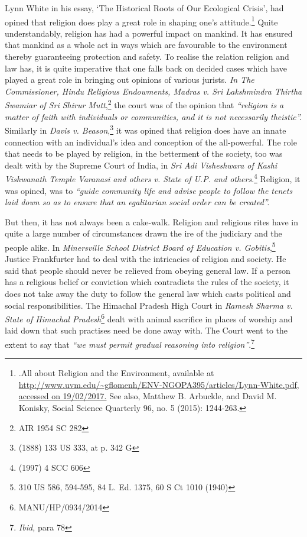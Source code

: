 \begin{multicols}{2}
\noi
Lynn White in his essay, ‘The Historical Roots of Our Ecological Crisis’, had opined that
religion does play a great role in shaping one’s attitude.\footnote{.All about Religion and the Environment, available at \url{http://www.uvm.edu/~gflomenh/ENV-NGOPA395/articles/Lynn-White.pdf, accessed on 19/02/2017.} See also, Matthew B. Arbuckle, and David M. Konisky, Social Science Quarterly 96, no. 5 (2015): 1244-263.} Quite understandably, religion has
had a powerful impact on mankind. It has ensured that mankind as a whole act in ways which
are favourable to the environment thereby guaranteeing protection and safety.
To realise the relation religion and law has, it is quite imperative that one falls back on decided
cases which have played a great role in bringing out opinions of various jurists. \textit{In The
Commissioner, Hindu Religious Endowments, Madras v. Sri Lakshmindra Thirtha Swamiar of
Sri Shirur Mutt},\footnote{AIR 1954 SC 282} the court was of the opinion that \textit{“religion is a matter of faith with individuals or communities, and it is not necessarily theistic”.} Similarly in \textit{Davis v. Beason},\footnote{(1888) 133 US 333, at p. 342 G} it was opined that religion does have an innate connection with an individual’s idea and conception of the all-powerful. The role that needs to be played by religion, in the betterment of the society, too was dealt with by the Supreme Court of India, in \textit{Sri Adi Visheshwara of Kashi Vishwanath Temple Varanasi and others v. State of U.P. and others}.\footnote{(1997) 4 SCC 606} Religion, it was opined, was to \textit{“guide community life and advise people to follow the tenets laid down so as to ensure that an egalitarian social order can be created”.}

\noi
But then, it has not always been a cake-walk. Religion and religious rites have in quite a large
number of circumstances drawn the ire of the judiciary and the people alike. In \textit{Minersville School District Board of Education v. Gobitis},\footnote{310 US 586, 594-595, 84 L. Ed. 1375, 60 S Ct 1010 (1940)} Justice Frankfurter had to deal with the
intricacies of religion and society. He said that people should never be relieved from obeying
general law. If a person has a religious belief or conviction which contradicts the rules of the
society, it does not take away the duty to follow the general law which casts political and social
responsibilities. The Himachal Pradesh High Court in \textit{Ramesh Sharma v. State of Himachal
Pradesh}\footnote{MANU/HP/0934/2014} dealt with animal sacrifice in places of worship and laid down that such practises
need be done away with. The Court went to the extent to say that \textit{“we must permit gradual
reasoning into religion”}.\footnote{\textit{Ibid,} para 78}


\end{multicols}
